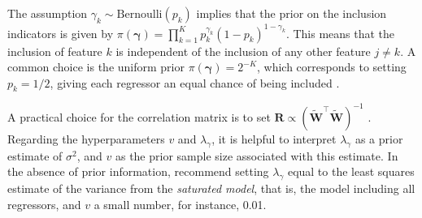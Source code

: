 The assumption \(\gamma_k \sim \text{Bernoulli}(p_k)\) implies that the prior on the inclusion indicators is given by \(\pi(\boldsymbol{\gamma}) = \prod_{k=1}^K p_k^{\gamma_k} (1 - p_k)^{1 - \gamma_k}\). This means that the inclusion of feature \(k\) is independent of the inclusion of any other feature \(j \neq k\). A common choice is the uniform prior \(\pi(\boldsymbol{\gamma}) = 2^{-K}\), which corresponds to setting \(p_k = 1/2\), giving each regressor an equal chance of being included \cite{Ishwaran2005}.

A practical choice for the correlation matrix is to set \(\mathbf{R} \propto (\tilde{\mathbf{W}}^{\top} \tilde{\mathbf{W}})^{-1}\) \cite{george1993variable}. Regarding the hyperparameters \(v\) and \(\lambda_{\gamma}\), it is helpful to interpret \(\lambda_{\gamma}\) as a prior estimate of \(\sigma^2\), and \(v\) as the prior sample size associated with this estimate. In the absence of prior information, \cite{george1997approaches} recommend setting \(\lambda_{\gamma}\) equal to the least squares estimate of the variance from the \textit{saturated model}, that is, the model including all regressors, and \(v\) a small number, for instance, 0.01.

